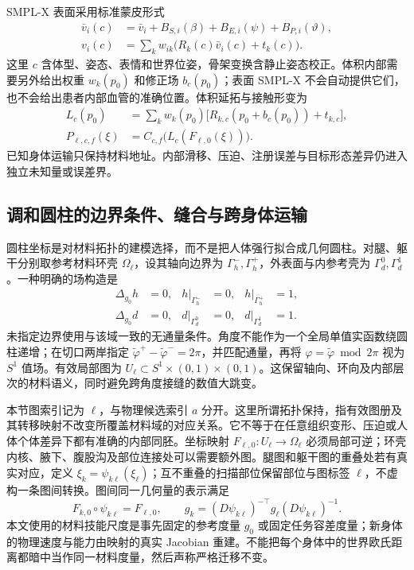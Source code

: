\documentclass[11pt,a4paper]{article}
\numberwithin{equation}{section}
\theoremstyle{definition}
\begin{document}
SMPL-X 表面采用标准蒙皮形式\cite{pavlakos2019}
\begin{align}
 \bar v_i(c)&=\bar v_i+B_{S,i}(\beta)+B_{E,i}(\psi)+B_{P,i}(\vartheta),\\
 v_i(c)&=\sum_k w_{ik}\bigl(R_k(c)\bar v_i(c)+t_k(c)\bigr).
\end{align}
这里 $c$ 含体型、姿态、表情和世界位姿，骨架变换含静止姿态校正。体积内部需要另外给出权重 $w_k(p_0)$ 和修正场 $b_c(p_0)$；表面 SMPL-X 不会自动提供它们，也不会给出患者内部血管的准确位置。体积延拓与接触形变为
\begin{align}
 L_c(p_0)&=\sum_k w_k(p_0)\bigl[R_{k,c}(p_0+b_c(p_0))+t_{k,c}\bigr],\\
 P_{\ell,c,f}(\xi)&=C_{c,f}\bigl(L_c(F_{\ell,0}(\xi))\bigr).
\end{align}
已知身体运输只保持材料地址。内部滑移、压迫、注册误差与目标形态差异仍进入独立未知量或误差界。

\subsection{调和圆柱的边界条件、缝合与跨身体运输}
\label{sec:v43:harmonic-detail}
圆柱坐标是对材料拓扑的建模选择，而不是把人体强行拟合成几何圆柱。对腿、躯干分别取参考材料环壳 $\Omega_\ell$，设其轴向边界为 $\Gamma_h^-,\Gamma_h^+$，外表面与内参考壳为 $\Gamma_d^0,\Gamma_d^1$。一种明确的场构造是
\begin{align}
 \Delta_{g_0}h&=0,& h|_{\Gamma_h^-}&=0,&h|_{\Gamma_h^+}&=1,\\
 \Delta_{g_0}d&=0,& d|_{\Gamma_d^0}&=0,&d|_{\Gamma_d^1}&=1.
\end{align}
未指定边界使用与该域一致的无通量条件。角度不能作为一个全局单值实函数绕圆柱递增；在切口两岸指定 $\widetilde\varphi^+-\widetilde\varphi^-=2\pi$，并匹配通量，再将 $\varphi=\widetilde\varphi\bmod 2\pi$ 视为 $S^1$ 值场。有效局部图为 $U_\ell\subset S^1\times(0,1)\times(0,1)$。这保留轴向、环向及内部层次的材料语义，同时避免跨角度接缝的数值大跳变。

本节图索引记为 $\ell$，与物理候选索引 $a$ 分开。这里所谓拓扑保持，指有效图册及其转移映射不改变所覆盖材料域的对应关系。它不等于在任意组织变形、压迫或人体个体差异下都有准确的内部同胚。坐标映射 $F_{\ell,0}:U_\ell\to\Omega_\ell$ 必须局部可逆；环壳内核、腋下、腹股沟及部位连接处可以需要额外图。腿图和躯干图的重叠处若有真实对应，定义 $\xi_k=\psi_{k\ell}(\xi_\ell)$；互不重叠的扫描部位保留部位与图标签 $\ell$，不虚构一条图间转换。图间同一几何量的表示满足
\begin{equation}
 F_{k,0}\circ\psi_{k\ell}=F_{\ell,0},\qquad
 g_k=(D\psi_{k\ell})^{-\top}g_\ell(D\psi_{k\ell})^{-1}.
\end{equation}
本文使用的材料技能尺度是事先固定的参考度量 $g_0$ 或固定任务容差度量；新身体的物理速度与能力由映射的真实 Jacobian 重建。不能把每个身体中的世界欧氏距离都暗中当作同一材料度量，然后声称严格迁移不变。
\end{document}
